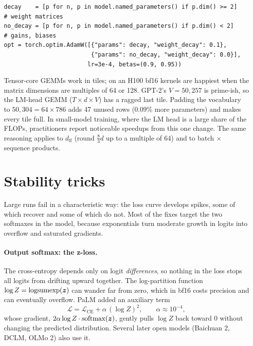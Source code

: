 \begin{lstlisting}[caption={Parameter groups for decoupled weight decay.},label={lst:archdesign:wd}]
decay    = [p for n, p in model.named_parameters() if p.dim() >= 2]   # weight matrices
no_decay = [p for n, p in model.named_parameters() if p.dim() < 2]    # gains, biases
opt = torch.optim.AdamW([{"params": decay, "weight_decay": 0.1},
                         {"params": no_decay, "weight_decay": 0.0}],
                        lr=3e-4, betas=(0.9, 0.95))
\end{lstlisting}



\begin{napkinmath}
Tensor-core GEMMs work in tiles; on an H100 bf16 kernels are happiest when the matrix dimensions are
multiples of 64 or 128. GPT-2's $V=50{,}257$ is prime-ish, so the LM-head GEMM ($T\times d\times V$) has a
ragged last tile. Padding the vocabulary to $50{,}304=64\times786$ adds 47 unused rows (0.09\% more
parameters) and makes every tile full. In small-model training, where the LM head is a large share of the
FLOPs, practitioners report noticeable speedups from this one change. The same reasoning applies to
$d_\text{ff}$ (round $\frac83d$ up to a multiple of 64) and to batch $\times$ sequence products.
\end{napkinmath}

\section{Stability tricks}\label{sec:archdesign:stability}

Large runs fail in a characteristic way: the loss curve develops spikes, some of which recover and some
of which do not. Most of the fixes target the two softmaxes in the model, because exponentials turn
moderate growth in logits into overflow and saturated gradients.

\paragraph{Output softmax: the z-loss.} The cross-entropy depends only on logit \emph{differences}, so
nothing in the loss stops all logits from drifting upward together. The log-partition function
$\log Z=\operatorname{logsumexp}(\bm{z})$ can wander far from zero, which in bf16 costs precision and
can eventually overflow. PaLM added an auxiliary term
\begin{equation}
\mathcal{L} = \mathcal{L}_\text{CE} + \alpha\,(\log Z)^2,\qquad \alpha\approx10^{-4},
\label{eq:archdesign:zloss}
\end{equation}
whose gradient, $2\alpha\log Z\cdot\operatorname{softmax}(\bm{z})$, gently pulls $\log Z$ back toward 0 without changing
the predicted distribution. Several later open models (Baichuan 2, DCLM, OLMo 2) also use it.

